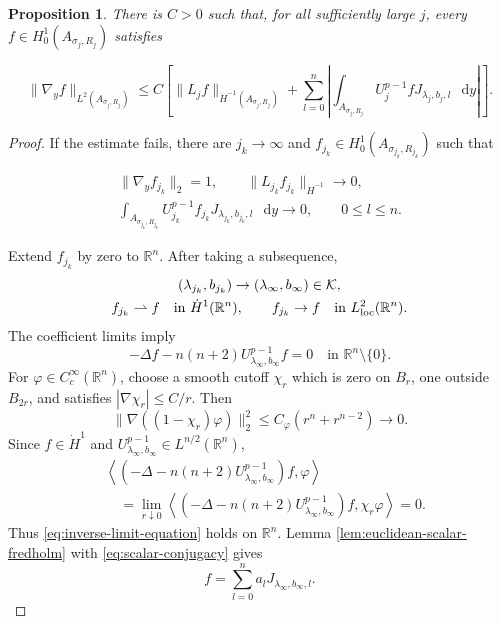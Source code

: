 \documentclass[11pt]{article}
\numberwithin{equation}{section}
\newtheorem{proposition}[theorem]{Proposition}
\theoremstyle{remark}
\newcommand{\R}{\mathbb R}
\newcommand{\norm}[1]{\lVert #1\rVert}
\newcommand{\dd}{\mathop{}\!\mathrm{d}}
\begin{document}
\begin{proposition}\label{prop:constrained-inverse}
There is \(C>0\) such that, for all sufficiently large \(j\), every
\(f\in H_0^1(A_{\sigma_j,R_j})\) satisfies
 
\[
 \norm{\nabla_yf}_{L^2(A_{\sigma_j,R_j})}
 \le C\left[
 \norm{ L_jf}_{\dot H^{-1}(A_{\sigma_j,R_j})}
 +\sum_{l=0}^n
 \left|\int_{A_{\sigma_j,R_j}}
 U_j^{p-1}fJ_{\lambda_j,b_j,l}\,\dd y\right|
 \right].
\]

\end{proposition}

\begin{proof}
If the estimate fails, there are \(j_k\to\infty\) and
\(f_{j_k}\in H_0^1(A_{\sigma_{j_k},R_{j_k}})\) such that
 
\[
 \begin{gathered}
 \norm{\nabla_yf_{j_k}}_2=1,\qquad
 \norm{ L_{j_k}f_{j_k}}_{\dot H^{-1}}\to0,\\
 \int_{A_{\sigma_{j_k},R_{j_k}}}
 U_{j_k}^{p-1}f_{j_k}J_{\lambda_{j_k},b_{j_k},l}\,\dd y
 \to0,\qquad 0\le l\le n.
 \end{gathered}
\]

Extend \(f_{j_k}\) by zero to \(\R^n\). After taking a subsequence,
\begin{equation}\label{eq:inverse-weak-compactness}
 \begin{gathered}
 (\lambda_{j_k},b_{j_k})\to
 (\lambda_\infty,b_\infty)\in\mathcal K,\\
 f_{j_k}\rightharpoonup f\quad\text{in }\dot H^1(\R^n),\qquad
 f_{j_k}\to f\quad\text{in }L^2_{\rm loc}(\R^n).
 \end{gathered}
\end{equation}
The coefficient limits imply
\begin{equation}\label{eq:inverse-limit-equation}
 -\Delta f-n(n+2)U_{\lambda_\infty,b_\infty}^{p-1}f=0
 \quad\text{in }\R^n\setminus\{0\}.
\end{equation}
For \(\varphi\in C_c^\infty(\R^n)\), choose a smooth cutoff \(\chi_r\)
which is zero on \(B_r\), one outside \(B_{2r}\), and satisfies
\(|\nabla\chi_r|\le C/r\). Then
\[
 \|\nabla((1-\chi_r)\varphi)\|_2^2
 \le C_\varphi(r^n+r^{n-2})\to0.
\]
Since \(f\in\dot H^1\) and
\(U_{\lambda_\infty,b_\infty}^{p-1}\in L^{n/2}(\R^n)\),
\[
 \begin{aligned}
 &\left\langle
 (-\Delta-n(n+2)U_{\lambda_\infty,b_\infty}^{p-1})f,\varphi
 \right\rangle\\
 &\quad=\lim_{r\downarrow0}\left\langle
 (-\Delta-n(n+2)U_{\lambda_\infty,b_\infty}^{p-1})f,\chi_r\varphi
 \right\rangle=0.
 \end{aligned}
\]
Thus \eqref{eq:inverse-limit-equation} holds on \(\R^n\).
Lemma  \ref{lem:euclidean-scalar-fredholm} with
\eqref{eq:scalar-conjugacy} gives
\[
 f=\sum_{l=0}^na_lJ_{\lambda_\infty,b_\infty,l}.
\]


\end{proof}
\end{document}
